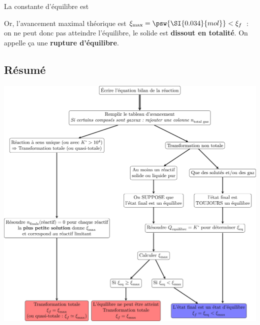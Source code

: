 \documentclass[../../main/main.tex]{subfiles}
\begin{document}
La constante d'équilibre est

Or, l'avancement maximal théorique est $\xi_{\max} = \psw{\SI{0.034}{mol}} <
	\xi_f$~: on ne peut donc pas atteindre l'équilibre, le solide est
\textbf{dissout en totalité}. On appelle ça une \textbf{rupture d'équilibre}.

\subsection{Résumé}

\begin{center}
	\includegraphics[width=\linewidth]{resume}
\end{center}
\end{document}
